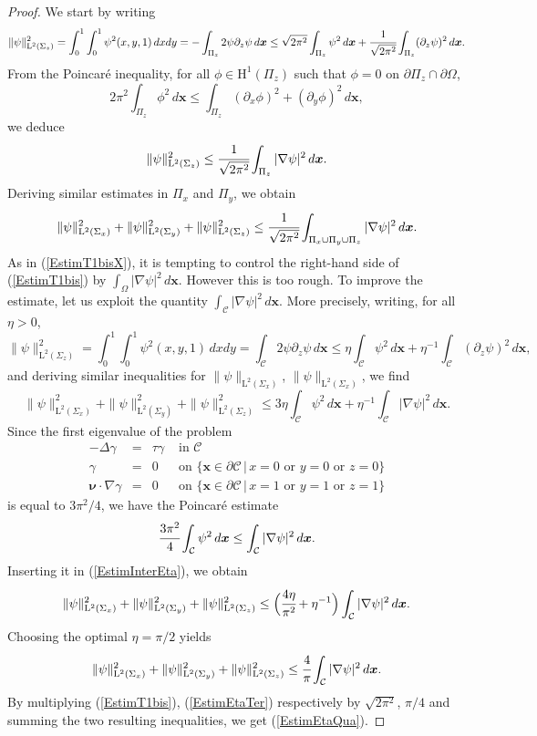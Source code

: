 \documentclass[11pt,a4paper]{article}
\newcommand{\dsp}{\displaystyle}
\newcommand{\Om}{\Omega}
\newcommand{\mrm}[1]{\mathrm{#1}}
\newcommand{\bfx}{\boldsymbol{x}}
\newcommand{\bfnu}{\boldsymbol{\nu}}
\newcommand{\mL}{\mrm{L}}
\newcommand{\mH}{\mrm{H}}
\begin{document}
\begin{proof}
We start by writing 
\[
\|\psi\|_{\mL^2(\Sigma_z)}^2 =\dsp\int_0^1\int_0^1\psi^2(x,y,1)\,dxdy=-\dsp\int_{\Pi_z}2\psi\partial_z\psi\,d\bfx\le\sqrt{2\pi^2}\dsp\int_{\Pi_z}\psi^2\,d\bfx+\cfrac{1}{\sqrt{2\pi^2}}\dsp\int_{\Pi_z}(\partial_z\psi)^2\,d\bfx.
\]
From the Poincar\'e inequality, for all $\phi\in\mH^1(\Pi_z)$ such that $\phi=0$ on $\partial\Pi_z\cap\partial\Om$,
\[
2\pi^2\dsp\int_{\Pi_z}\phi^2\,d\bfx \le \dsp\int_{\Pi_z}(\partial_x\phi)^2+(\partial_y\phi)^2\,d\bfx,
\]
we deduce 
\[
\|\psi\|_{\mL^2(\Sigma_z)}^2 \le \cfrac{1}{\sqrt{2\pi^2}}\int_{\Pi_z}|\nabla\psi|^2\,d\bfx.
\]
Deriving similar estimates in $\Pi_x$ and $\Pi_y$, we obtain 
\begin{equation}\label{EstimT1bis}
\|\psi\|^2_{\mL^2(\Sigma_x)}+\|\psi\|^2_{\mL^2(\Sigma_y)}+\|\psi\|^2_{\mL^2(\Sigma_z)} \le \cfrac{1}{\sqrt{2\pi^2}}\int_{\Pi_x\cup\Pi_y\cup\Pi_z}|\nabla\psi|^2\,d\bfx.
\end{equation}
As in (\ref{EstimT1bisX}), it is tempting  to control the right-hand side of (\ref{EstimT1bis}) by $\int_{\Om}|\nabla\psi|^2\,d\bfx$. However this is too rough. To improve the estimate, let us exploit the quantity $\int_{\mathcal{C}}|\nabla\psi|^2\,d\bfx$. More precisely, writing, for all $\eta>0$,
\[
\|\psi\|_{\mL^2(\Sigma_z)}^2 =\dsp\int_0^1\int_0^1\psi^2(x,y,1)\,dxdy=\int_{\mathcal{C}}2\psi\partial_z\psi\,d\bfx
\le \eta\int_{\mathcal{C}}\psi^2\,d\bfx+\eta^{-1}\int_{\mathcal{C}}(\partial_z\psi)^2\,d\bfx,
\]
and deriving similar inequalities for $\|\psi\|_{\mL^2(\Sigma_x)}$, $\|\psi\|_{\mL^2(\Sigma_x)}$, we find 
\begin{equation}\label{EstimInterEta}
\|\psi\|^2_{\mL^2(\Sigma_x)}+\|\psi\|^2_{\mL^2(\Sigma_y)}+\|\psi\|^2_{\mL^2(\Sigma_z)}
\le\dsp 3\eta\int_{\mathcal{C}}\psi^2\,d\bfx+\eta^{-1}\int_{\mathcal{C}}|\nabla\psi|^2\,d\bfx . 
\end{equation}
Since the first eigenvalue of the problem
\[
\begin{array}{|rcll}
-\Delta \gamma&=&\tau\gamma&\mbox{ in }\mathcal{C}\\[2pt]
\gamma&=& 0 &\mbox{ on }\{\bfx\in\partial\mathcal{C}\,|\,x=0\mbox{ or }y=0\mbox{ or }z=0\}\\[2pt]
\bfnu\cdot\nabla\gamma&=& 0 &\mbox{ on }\{\bfx\in\partial\mathcal{C}\,|\,x=1\mbox{ or }y=1\mbox{ or }z=1\}
\end{array}
\]
is equal to $3\pi^2/4$, we have the Poincar\'e estimate
\[
\cfrac{3\pi^2}{4}\int_{\mathcal{C}}\psi^2\,d\bfx \le \int_{\mathcal{C}}|\nabla\psi|^2\,d\bfx.
\]
Inserting it in (\ref{EstimInterEta}), we obtain 
\[
\|\psi\|^2_{\mL^2(\Sigma_x)}+\|\psi\|^2_{\mL^2(\Sigma_y)}+\|\psi\|^2_{\mL^2(\Sigma_z)} \le \Big(\cfrac{4\eta}{\pi^2}+\eta^{-1}\Big) \int_{\mathcal{C}}|\nabla\psi|^2\,d\bfx.
\]
Choosing the optimal $\eta=\pi/2$ yields 
\begin{equation}\label{EstimEtaTer}
\|\psi\|^2_{\mL^2(\Sigma_x)}+\|\psi\|^2_{\mL^2(\Sigma_y)}+\|\psi\|^2_{\mL^2(\Sigma_z)} \le \cfrac{4}{\pi} \int_{\mathcal{C}}|\nabla\psi|^2\,d\bfx.
\end{equation}
By multiplying (\ref{EstimT1bis}), (\ref{EstimEtaTer}) respectively by $\sqrt{2\pi^2}$, $\pi/4$ and summing the two resulting inequalities, we get (\ref{EstimEtaQua}).
\end{proof}
\end{document}
